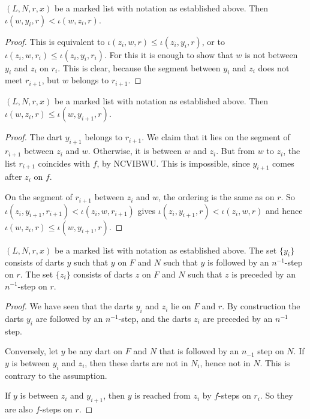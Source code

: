 \begin{lemma}
$(L,N,r,x)$ be a marked list with notation as established above.
Then $\iota(w,y_i,r) < \iota(w,z_i,r)$.
\end{lemma}

\begin{proof}
This is equivalent to $\iota(z_i,w,r) \le \iota(z_i,y_i,r)$,  or to $\iota(z_i,w,r_i)\le \iota(z_i,y_i,r_i)$. 
For this it is enough to show that $w$ is not between $y_i$ and $z_i$ on $r_i$.  This is clear,
because the segment between $y_i$ and $z_i$ does not meet $r_{i+1}$, but $w$ belongs to $r_{i+1}$.
\end{proof}

\begin{lemma}
$(L,N,r,x)$ be a marked list with notation as established above.
Then $\iota(w,z_i,r) \le \iota(w,y_{i+1},r)$.
\end{lemma}

\begin{proof}  
The dart $y_{i+1}$ belongs to $r_{i+1}$.  We claim that it lies on the segment of $r_{i+1}$ between $z_i$ and $w$.
Otherwise, it is between $w$ and $z_i$.  But from $w$ to $z_i$, the list $r_{i+1}$ coincides with $f$, by NCVIBWU.  This is impossible,
since $y_{i+1}$ comes after $z_i$ on $f$.

On the segment of $r_{i+1}$ between $z_i$ and $w$, the ordering is the same as on $r$.
So $\iota(z_i,y_{i+1},r_{i+1}) < \iota(z_i,w,r_{i+1})$ gives $\iota(z_i,y_{i+1},r) < \iota(z_i,w,r)$ and hence
$\iota(w,z_i,r) \le \iota(w,y_{i+1},r)$.
\end{proof}

\begin{lemma} 
$(L,N,r,x)$ be a marked list with notation as established above.
The set $\{y_i\}$ consists of darts $y$ such that
$y$ on $F$ and $N$ such that $y$ is followed by an 
$n^{-1}$-step on $r$.
The set $\{z_i\}$ consists of darts $z$ on $F$ and $N$ such that
$z$ is preceded by an $n^{-1}$-step on $r$.
\end{lemma} 

\begin{proof}  We have seen that the darts $y_i$ and $z_i$ lie on $F$ and $r$.
By construction the darts $y_i$ are followed by an $n^{-1}$-step, and the darts
$z_i$ are preceded by an $n^{-1}$ step.

Conversely, let $y$ be any dart on $F$ and $N$ that is followed by an $n_{-1}$ step on $N$.
If $y$ is between $y_i$ and $z_i$, then these darts are not in $N_i$, hence not in $N$.  
This is contrary
to the assumption.

If $y$ is between $z_i$ and $y_{i+1}$, then $y$ is reached from $z_i$ by $f$-steps on $r_i$.
So they are also $f$-steps on $r$.
\end{proof}

